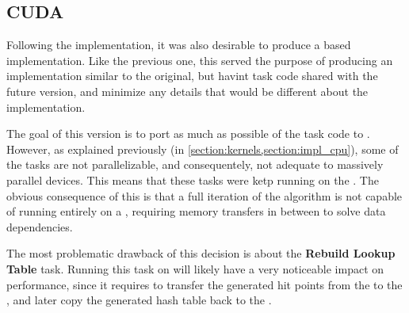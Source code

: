 \documentclass[main.tex]{subfiles}
\begin{document}
\subsection{CUDA} \label{section:impl_cuda}

Following the \cpu implementation, it was also desirable to produce a \cuda based implementation. Like the previous one, this served the purpose of producing an implementation similar to the original, but havint task code shared with the future \starpu version, and minimize any details that would be different about the implementation.

The goal of this version is to port as much as possible of the \cpu task code to \cuda. However, as explained previously (in \cref{section:kernels,section:impl_cpu}), some of the tasks are not parallelizable, and consequentely, not adequate to massively parallel devices. This means that these tasks were ketp running on the \cpu. The obvious consequence of this is that a full iteration of the algorithm is not capable of running entirely on a \gpu, requiring memory transfers in between to solve data dependencies.

The most problematic drawback of this decision is about the \textbf{Rebuild Lookup Table} task. Running this task on \cpu will likely have a very noticeable impact on performance, since it requires to transfer the generated hit points from the \gpu to the \cpu, and later copy the generated hash table back to the \gpu.
\end{document}
